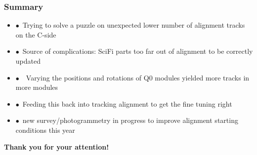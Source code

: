 \documentclass[aspectratio=1610, 12pt, xcolor=dvipsnames]{beamer}
\begin{document}
\begin{frame}\frametitle{Summary}
  \begin{itemize}
    \item $\bullet$\, Trying to solve a puzzle on unexpected lower number of alignment tracks on the C-side
    \item $\bullet$\, Source of complications: SciFi parts too far out of alignment to be correctly updated
    \item $\bullet$\, \to\, Varying the positions and rotations of Q0 modules yielded more tracks in more modules
    \item $\bullet$\, Feeding this back into tracking alignment to get the fine tuning right
    \item $\bullet$\, new survey/photogrammetry in progress to improve alignment starting conditions this year
  \end{itemize}
  \textbf{Thank you for your attention!}
\end{frame}

%  


\end{document}

